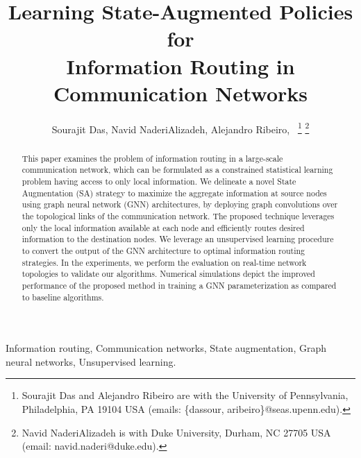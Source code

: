 \documentclass[lettersize,journal]{IEEEtran}
\begin{document}
\title{Learning State-Augmented Policies for \\ Information Routing in Communication Networks}

\author{Sourajit Das, Navid NaderiAlizadeh, Alejandro Ribeiro,~
\thanks{Sourajit Das and Alejandro Ribeiro are with the University of Pennsylvania, Philadelphia, PA 19104 USA (emails: \{dassour, aribeiro\}@seas.upenn.edu).}%
\thanks{Navid NaderiAlizadeh is with Duke University, Durham, NC 27705 USA (email: navid.naderi@duke.edu).}}



\maketitle

\begin{abstract}
This paper examines the problem of information routing in a large-scale communication network, which can be formulated as a constrained statistical learning problem having access to only local information. We delineate a novel State Augmentation (SA) strategy to maximize the aggregate information at source nodes using graph neural network (GNN) architectures, by deploying graph convolutions over the topological links of the communication network. The proposed technique leverages only the local information available at each node and efficiently routes desired information to the destination nodes. We leverage an unsupervised learning procedure to convert the output of the GNN architecture to optimal information routing strategies. In the experiments, we perform the evaluation on real-time network topologies to validate our algorithms. Numerical simulations depict the improved performance of the proposed method in training a GNN parameterization as compared to baseline algorithms.
\end{abstract}

\begin{IEEEkeywords}
Information routing, Communication networks, State augmentation, Graph neural networks, Unsupervised learning.
\end{IEEEkeywords}
\end{document}
